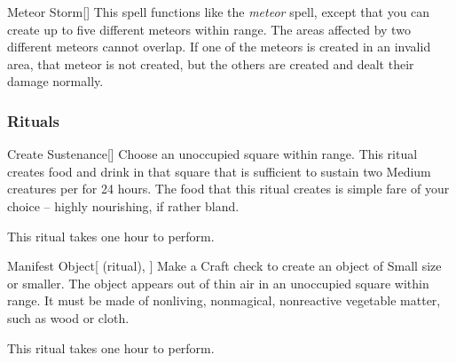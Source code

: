 \lowercase{\hypertarget{spell:Meteor Storm}{}}\label{spell:Meteor Storm}
\begin{apability}[\nth{5}]{\hypertarget{spell:Meteor Storm}{Meteor Storm}}[]
This spell functions like the \textit{meteor} spell, except that you can create up to five different meteors within \rnglong range.
The areas affected by two different meteors cannot overlap.
If one of the meteors is created in an invalid area, that meteor is not created, but the others are created and dealt their damage normally.
\end{apability}
\vspace{0.25em}



\subsubsection{Rituals}


\lowercase{\hypertarget{spell:Create Sustenance}{}}\label{spell:Create Sustenance}
\begin{apability}[\nth{2}]{\hypertarget{spell:Create Sustenance}{Create Sustenance}}[]
Choose an unoccupied square within \rngclose range.
This ritual creates food and drink in that square that is sufficient to sustain two Medium creatures per  for 24 hours.
The food that this ritual creates is simple fare of your choice -- highly nourishing, if rather bland.

This ritual takes one hour to perform.
\end{apability}
\vspace{0.25em}



\lowercase{\hypertarget{spell:Manifest Object}{}}\label{spell:Manifest Object}
\begin{attuneability}[\nth{2}]{\hypertarget{spell:Manifest Object}{Manifest Object}}[ (ritual), ]
Make a Craft check to create an object of Small size or smaller.
The object appears out of thin air in an unoccupied square within \rngclose range.
It must be made of nonliving, nonmagical, nonreactive vegetable matter, such as wood or cloth.

This ritual takes one hour to perform.
\end{attuneability}
\vspace{0.25em}


